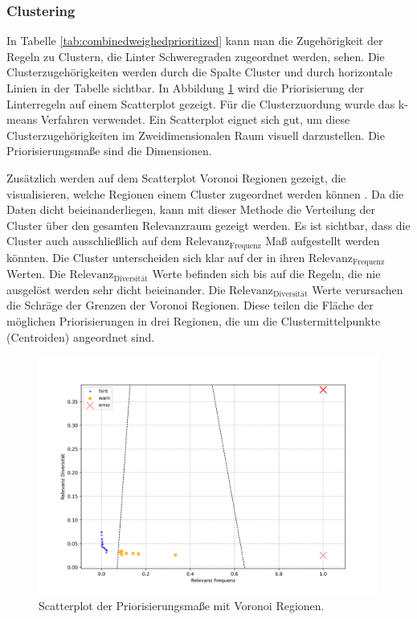\subsubsection{Clustering} \label{sec:analclustering}
In Tabelle \ref{tab:combinedweighedprioritized} kann man die Zugehörigkeit der Regeln zu Clustern, die Linter Schweregraden zugeordnet werden, sehen. Die Clusterzugehörigkeiten werden durch die Spalte Cluster und durch horizontale Linien in der Tabelle sichtbar. In Abbildung \ref{fig:clusterprioscatter} wird die Priorisierung der Linterregeln auf einem Scatterplot gezeigt. Für die Clusterzuordung wurde das k-means Verfahren verwendet. Ein Scatterplot eignet sich gut, um diese Clusterzugehörigkeiten im Zweidimensionalen Raum visuell darzustellen. Die Priorisierungsmaße sind die Dimensionen.

Zusätzlich werden auf dem Scatterplot Voronoi Regionen gezeigt, die visualisieren, welche Regionen einem Cluster zugeordnet werden können \parencite{klein_algorithmische_2022}. Da die Daten dicht beieinanderliegen, kann mit dieser Methode die Verteilung der Cluster über den gesamten Relevanzraum gezeigt werden. Es ist sichtbar, dass die Cluster auch ausschließlich auf dem $\text{Relevanz}_\text{Frequenz}$ Maß aufgestellt werden könnten. Die Cluster unterscheiden sich klar auf der in ihren $\text{Relevanz}_\text{Frequenz}$ Werten. Die $\text{Relevanz}_\text{Diversität}$ Werte befinden sich bis auf die Regeln, die nie ausgelöst werden sehr dicht beieinander. Die $\text{Relevanz}_\text{Diversität}$ Werte verursachen die Schräge der Grenzen der Voronoi Regionen. Diese teilen die Fläche der möglichen Priorisierungen in drei Regionen, die um die Clustermittelpunkte (Centroiden) angeordnet sind.

\begin{figure}[htbp]
  \centering
  \includegraphics[width=1\linewidth]{img/clusterprioscatter.png}
  \caption{Scatterplot der Priorisierungsmaße mit Voronoi Regionen.}
  \label{fig:clusterprioscatter}
\end{figure}


